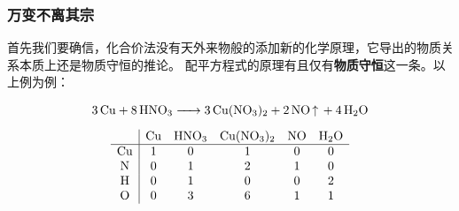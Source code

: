 \documentclass{ctexart}
\begin{document}
\subsubsection{万变不离其宗}
首先我们要确信，化合价法没有天外来物般的添加新的化学原理，它导出的物质关系本质上还是物质守恒的推论。
配平方程式的原理有且仅有\textbf{物质守恒}这一条。以上例为例：

\[
    \begin{gathered}
        \ce{3Cu + 8HNO3 -> 3Cu(NO3)2 + 2NO ^ + 4H2O} \\[0.5em]
        \begin{array}{c|ccccc}
            & \ce{Cu} & \ce{HNO3} & \ce{Cu(NO3)2} & \ce{NO} &
            \ce{H2O} \\
            \hline
            \ce{Cu} & 1 & 0 & 1 & 0 & 0\\
            \ce{N} & 0 & 1 & 2 & 1 & 0\\
            \ce{H} & 0 & 1 & 0 & 0 & 2\\
            \ce{O} & 0 & 3 & 6 & 1 & 1\\
        \end{array}
    \end{gathered}
\]
\end{document}
